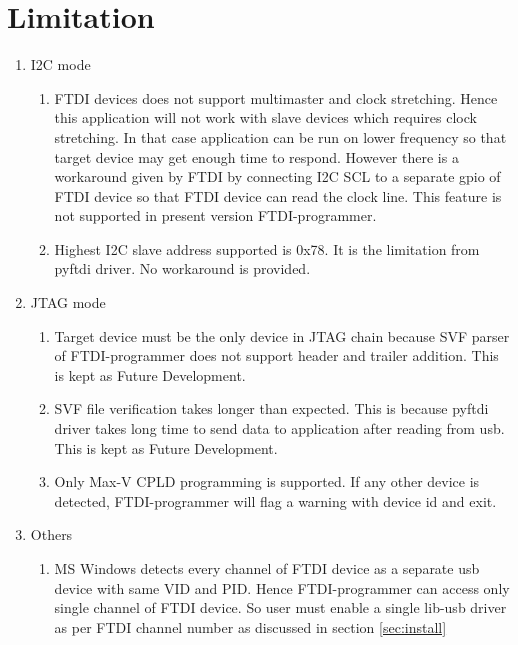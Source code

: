 \documentclass[a4paper,12pt]{report}%
\begin{document}
\section{Limitation}\label{sec:limit}
\begin{enumerate}
	\item I2C mode
		\begin{enumerate}
			\item 
			FTDI devices does not support multimaster and clock stretching. Hence this application will not work with
			slave devices which requires clock stretching. In that case application can be run on lower frequency
			so that target device may get enough time to respond. However there is a workaround given by FTDI by 
			connecting I2C SCL to a separate gpio of FTDI device so that FTDI device can read the clock line. This 
			feature is not supported in present version FTDI-programmer.

			\item	
			Highest I2C slave address supported is 0x78. It is the limitation from pyftdi driver. No workaround is provided.
		\end{enumerate}
	
	\item	JTAG mode
		\begin{enumerate}
			\item Target device must be the only device in JTAG chain because SVF parser of FTDI-programmer does not support
			header and trailer addition. This is kept as Future Development.
			\item
			SVF file verification takes longer than expected. This is because pyftdi driver takes long time to send data to 
			application after reading from usb. This is kept as Future Development.
			\item
			Only Max-V CPLD programming is supported. If any other device is detected, FTDI-programmer will flag a warning
			with device id and exit.  
		\end{enumerate}

	\item	Others
		\begin{enumerate}
			\item 
			MS Windows detects every channel of FTDI device as a separate usb device with same VID and PID. Hence FTDI-programmer
			can access only single channel of FTDI device. So user must enable a single lib-usb driver as per FTDI channel number
			as discussed in section \ref{sec:install}
		\end{enumerate}
	\end{enumerate}	
\end{document}
